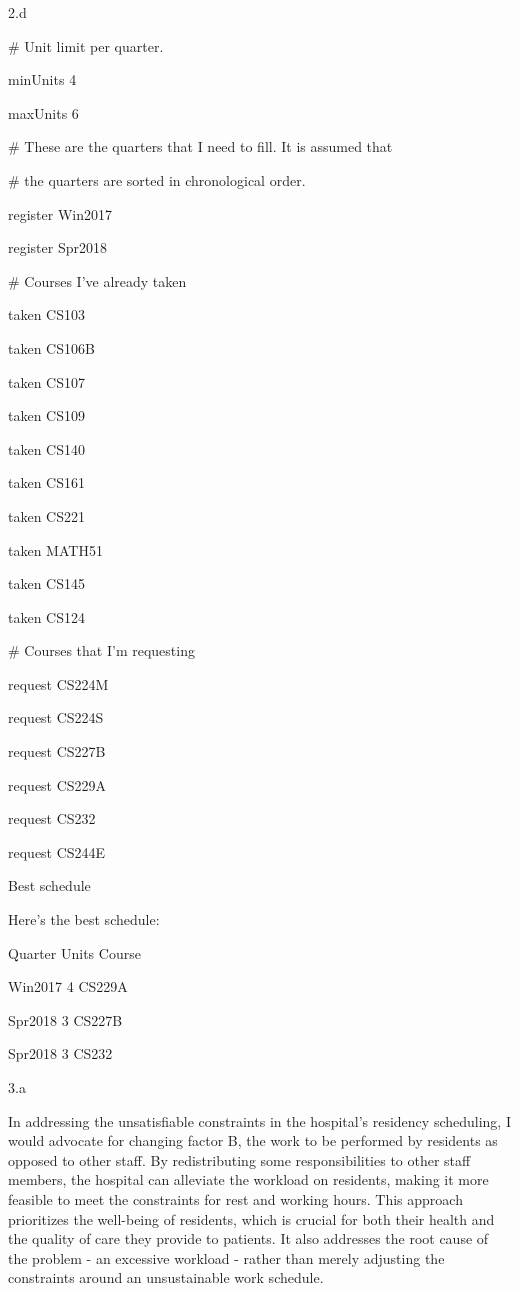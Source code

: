 \clearpage

\LARGE
2.d
\normalsize

\begin{answer}
\# Unit limit per quarter.

minUnits 4

maxUnits 6

\# These are the quarters that I need to fill. It is assumed that

\# the quarters are sorted in chronological order.

register Win2017

register Spr2018

\# Courses I've already taken

taken CS103

taken CS106B

taken CS107

taken CS109

taken CS140

taken CS161

taken CS221

taken MATH51

taken CS145

taken CS124

\# Courses that I'm requesting

request CS224M

request CS224S  

request CS227B   

request CS229A   

request CS232   

request CS244E   

Best schedule 

Here's the best schedule:

Quarter         Units   Course

  Win2017       4       CS229A

  Spr2018       3       CS227B

  Spr2018       3       CS232

\end{answer}
\clearpage

\LARGE
3.a
\normalsize

\begin{answer}
In addressing the unsatisfiable constraints in the hospital's residency scheduling, I would advocate for changing factor B, the work to be performed by residents as opposed to other staff. By redistributing some responsibilities to other staff members, the hospital can alleviate the workload on residents, making it more feasible to meet the constraints for rest and working hours. This approach prioritizes the well-being of residents, which is crucial for both their health and the quality of care they provide to patients. It also addresses the root cause of the problem - an excessive workload - rather than merely adjusting the constraints around an unsustainable work schedule.
\end{answer}
\clearpage



